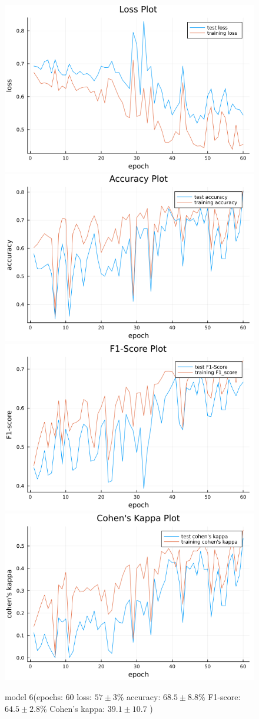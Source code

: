 \documentclass[
a4paper, 
12pt,
grayscalebody, %
abstract=on,
twoside, BCOR10mm, 12pt, DIV13,headinclude, footexclude, final, abstracton, openright
]{ibireprt}
\numberwithin{equation}{chapter}
\numberwithin{table}{chapter}
\numberwithin{figure}{chapter}
\numberwithin{algorithm}{chapter}
\numberwithin{example}{chapter}
\numberwithin{example}{chapter}
\begin{document}
\begin{figure}
	\includegraphics[width=0.4\linewidth]{loss_png_final_2_2.png}\hfill
	\includegraphics[width=0.4\linewidth]{accuracy_png_final_2_2.png}
	\\[\smallskipamount]
	\includegraphics[width=0.4\linewidth]{f1_score_png_final_2_2.png}\hfill
	\includegraphics[width=0.4\linewidth]{cohens_kappa_png_final_2_2.png}
	\caption{model 6(epochs: 60 loss: $57\pm3\% $ accuracy: $68.5\pm8.8\%$ F1-score: $64.5\pm2.8\%$  Cohen's kappa: $39.1\pm10.7$ )}
	\label{fig:model_6_60}
\end{figure}
\end{document}
